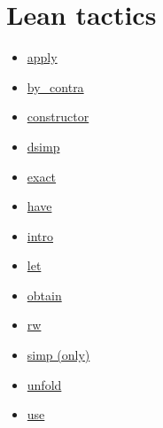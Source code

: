 \section{Lean tactics}

\begin{itemize}
    \item \href{https://leanprover-community.github.io/mathlib4_docs/tactics.html#Lean.Parser.Tactic.apply}{apply}
    \item \href{https://leanprover-community.github.io/mathlib4_docs/tactics.html#Batteries.Tactic.byContra}{by\_contra}
    \item \href{https://leanprover-community.github.io/mathlib4_docs/tactics.html#Lean.Parser.Tactic.constructor}{constructor}
    \item \href{https://leanprover-community.github.io/mathlib4_docs/tactics.html#Lean.Parser.Tactic.dsimp}{dsimp}
    \item \href{https://leanprover-community.github.io/mathlib4_docs/tactics.html#Lean.Parser.Tactic.exact}{exact}
    \item \href{https://leanprover-community.github.io/mathlib4_docs/tactics.html#Lean.Parser.Tactic.tacticHave__}{have}
    \item \href{https://leanprover-community.github.io/mathlib4_docs/tactics.html#Lean.Parser.Tactic.intro}{intro}
    \item \href{https://leanprover-community.github.io/mathlib4_docs/tactics.html#Lean.Parser.Tactic.tacticLet__}{let}
    \item \href{https://leanprover-community.github.io/mathlib4_docs/tactics.html#Lean.Parser.Tactic.obtain}{obtain}
    \item \href{https://leanprover-community.github.io/mathlib4_docs/tactics.html#Lean.Parser.Tactic.rwSeq}{rw}
    \item \href{https://leanprover-community.github.io/mathlib4_docs/tactics.html#Lean.Parser.Tactic.simp}{simp (only)}
    \item \href{https://leanprover-community.github.io/mathlib4_docs/tactics.html#Lean.Parser.Tactic.unfold}{unfold}
    \item \href{https://leanprover-community.github.io/mathlib4_docs/tactics.html#Mathlib.Tactic.useSyntax}{use}
\end{itemize}
